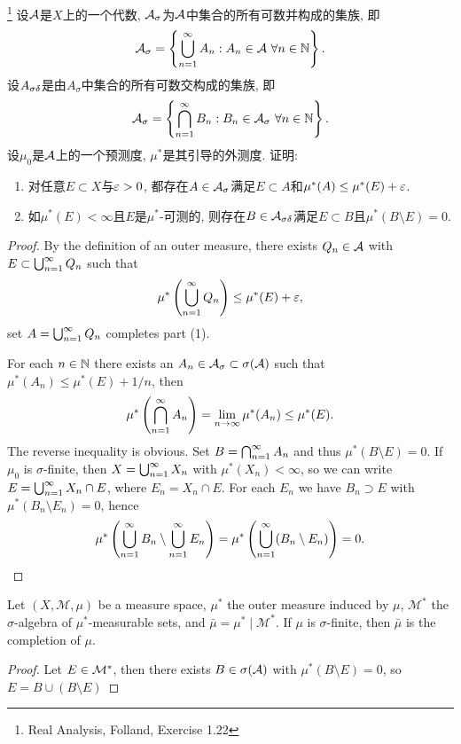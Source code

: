 \begin{exercise}\footnote{Real Analysis, Folland, Exercise 1.22}\label{ex1-22}
    设$\mathcal{A}$是$X$上的一个代数, $\mathcal{A}_\sigma$为$\mathcal{A}$中集合的所有可数并构成的集族, 即
    $$\mathcal{A}_\sigma = \left\{\bigcup_{n=1}^{\infty}A_n: A_n \in \mathcal{A}~\forall n \in \mathbb{N} \right\}.$$
    设$A_{\sigma \delta}$是由$A_\sigma$中集合的所有可数交构成的集族, 即
    $$\mathcal{A}_\sigma = \left\{\bigcap_{n=1}^{\infty}B_n: B_n \in \mathcal{A}_\sigma~\forall n \in \mathbb{N} \right\}.$$ 设$\mu_0$是$\mathcal{A}$上的一个预测度, $\mu^*$是其引导的外测度. 证明:
    \begin{enumerate}
        \item 对任意$E \subset X$与$\varepsilon > 0$, 都存在$A \in \mathcal{A}_\sigma$满足$E \subset A$和$\mu^*(A) \leq \mu^*(E) + \varepsilon$. 
        \item 如$\mu^*(E) < \infty$且$E$是$\mu^*$-可测的, 则存在$B \in \mathcal{A}_{\sigma \delta}$满足$E \subset B$且$\mu^*(B \setminus E) = 0$. 
    \end{enumerate}
\end{exercise}
\begin{proof}
    By the definition of an outer measure, there exists $Q_n \in \mathcal{A}$ with $E \subset \bigcup_{n=1}^{\infty}Q_n$ such that 
    $$\mu^*\left(\bigcup_{n=1}^{\infty}Q_n\right) \leq \mu^*(E) + \varepsilon, $$
    set $A = \bigcup_{n=1}^{\infty}Q_n$ completes part (1). 

    For each $n \in \mathbb{N}$ there exists an $A_n \in \mathcal{A}_\sigma \subset \sigma(\mathcal{A})$ such that 
    $\mu^*(A_n) \leq \mu^*(E) + 1/n$,
    then 
    $$\mu^*\left(\bigcap_{n=1}^{\infty}A_n\right)
    = \lim_{n \to \infty}\mu^*(A_n) \leq \mu^*(E).$$
    The reverse inequality is obvious. Set $B = \bigcap_{n=1}^{\infty}A_n$ and thus $\mu^*(B \setminus E) = 0$. 
    If $\mu_0$ is $\sigma$-finite, then $X = \bigcup_{n=1}^{\infty}X_n$ with $\mu^*(X_n) < \infty$, so we can write 
    $E = \bigcup_{n=1}^{\infty}X_n \cap E$, where $E_n = X_n \cap E$. For each $E_n$ we have $B_n \supset E$ with $\mu^*(B_n \setminus E_n) = 0$, hence 
    $$\mu^*\left(\bigcup_{n=1}^{\infty}B_n \setminus \bigcup_{n=1}^{\infty}E_n\right) = 
    \mu^*\left(\bigcup_{n=1}^{\infty}(B_n \setminus E_n)\right) = 0.$$
\end{proof}

\begin{exercise}
    Let $(X, \mathcal{M}, \mu)$ be a measure space, $\mu^*$ the outer measure induced by $\mu$, $\mathcal{M}^*$ the $\sigma$-algebra of $\mu^*$-measurable sets, and $\bar{\mu}=\mu^* \mid \mathcal{M}^*$.
    If $\mu$ is $\sigma$-finite, then $\bar{\mu}$ is the completion of $\mu$.
\end{exercise}
\begin{proof}
    Let $E \in \mathcal{M}^*$, then there exists $B \in \sigma(\mathcal{A})$ with $\mu^*(B \setminus E) = 0$, so $E = B \cup (B \setminus E)$
\end{proof}

